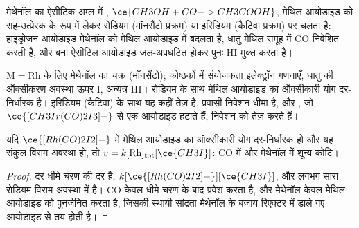 मेथेनॉल का ऐसीटिक अम्ल में , $\ce{CH3OH + CO -> CH3COOH}$, मेथिल आयोडाइड को
सह-उत्प्रेरक के रूप में लेकर रोडियम (मॉनसैंटो प्रक्रम) या इरिडियम (कैटिवा प्रक्रम) पर चलता है:
हाइड्रोजन आयोडाइड मेथेनॉल को मेथिल आयोडाइड में बदलता है, धातु
मेथिल समूह में CO निवेशित करती है, और बना ऐसीटिल आयोडाइड जल-अपघटित होकर
पुनः HI मुक्त करता है।

\begin{omfigure}

{\small $\mathrm M = \mathrm{Rh}$ के लिए मेथेनॉल का  चक्र (मॉनसैंटो); कोष्ठकों में संयोजकता
इलेक्ट्रॉन गणनाएँ, धातु की ऑक्सीकरण अवस्था ऊपर I, अन्यत्र III।
रोडियम के साथ मेथिल आयोडाइड का ऑक्सीकारी योग दर-निर्धारक है।
इरिडियम (कैटिवा) के साथ यह कहीं तेज़ है, प्रवासी निवेशन धीमा है, और
, जो $\ce{[CH3Ir(CO)2I3]-}$ से एक आयोडाइड हटाते हैं, निवेशन को तेज़ करते हैं।}
\end{omfigure}

\begin{proposition}[रोडियम प्रक्रम का दर नियम]\label{prop:b3:homogeneous-catalysis:monsanto-rate}
यदि $\ce{[Rh(CO)2I2]-}$ में मेथिल आयोडाइड का ऑक्सीकारी योग दर-निर्धारक हो और
यह संकुल विराम अवस्था हो, तो $v = k[\mathrm{Rh}]_{\mathrm{tot}}[\ce{CH3I}]$: CO में और
मेथेनॉल में शून्य कोटि।
\end{proposition}

\begin{proof}
दर धीमे चरण की दर है, $k[\ce{[Rh(CO)2I2]-}][\ce{CH3I}]$, और लगभग सारा रोडियम
विराम अवस्था में है। CO केवल धीमे चरण के बाद प्रवेश करता है, और मेथेनॉल केवल
मेथिल आयोडाइड को पुनर्जनित करता है, जिसकी स्थायी सांद्रता मेथेनॉल के बजाय
रिएक्टर में डाले गए आयोडाइड से तय होती है।
\end{proof}

